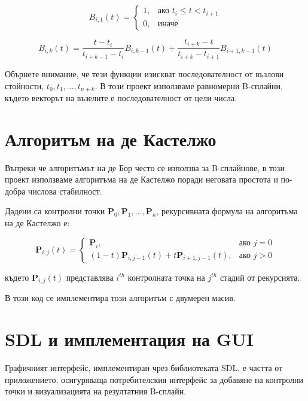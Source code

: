 \documentclass{article}
\begin{document}
\begin{equation}
B_{i,1}(t) = 
    \begin{cases}
    1, & \text{ако } t_i \leq t < t_{i+1} \\
    0, & \text{иначе}
    \end{cases}
\end{equation}

\begin{equation}
B_{i,k}(t) = \frac{t - t_i}{t_{i+k-1} - t_i} B_{i,k-1}(t) + \frac{t_{i+k} - t}{t_{i+k} - t_{i+1}} B_{i+1,k-1}(t)
\end{equation}

Обърнете внимание, че тези функции изискват последователност от възлови стойности, $t_0, t_1, ..., t_{n+k}$. В този проект използваме равномерни B-сплайни, където векторът на възелите е последователност от цели числа.

\section{Алгоритъм на де Кастелжо}
Въпреки че алгоритъмът на де Бор често се използва за B-сплайнове, в този проект използваме алгоритъма на де Кастелжо поради неговата простота и по-добра числова стабилност. 

Дадени са контролни точки $\mathbf{P}_0, \mathbf{P}_1, ..., \mathbf{P}_n$, рекурсивната формула на алгоритъма на де Кастелжо е:

\begin{equation}
\mathbf{P}_{i,j}(t) = 
    \begin{cases}
    \mathbf{P}_i, & \text{ако } j = 0 \\
    (1-t)\mathbf{P}_{i,j-1}(t) + t\mathbf{P}_{i+1,j-1}(t), & \text{ако } j > 0
    \end{cases}
\end{equation}

където $\mathbf{P}_{i,j}(t)$ представлява $i^{th}$ контролната точка на $j^{th}$ стадий от рекурсията. 

В този код се имплементира този алгоритъм с двумерен масив.

\section{SDL и имплементация на GUI}
Графичният интерфейс, имплементиран чрез библиотеката SDL, е частта от приложението, осигуряваща потребителския интерфейс за добавяне на контролни точки и визуализацията на резултатния B-сплайн.
\end{document}
